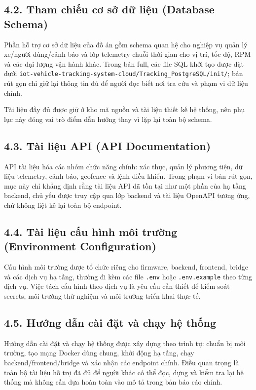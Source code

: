 \documentclass[a4paper]{extarticle}
\begin{document}
\subsection{4.2. Tham chiếu cơ sở dữ liệu (Database
Schema)}\label{42-tham-chiux1ebfu-cux1a1-sux1edf-dux1eef-liux1ec7u-database-schema}

Phần hỗ trợ cơ sở dữ liệu của đồ án gồm schema quan hệ cho nghiệp vụ quản lý xe/người dùng/cảnh báo và lớp telemetry chuỗi thời gian cho vị trí, tốc độ, RPM và các đại lượng vận hành khác. Trong bản full, các file SQL khởi tạo được đặt dưới \texttt{iot-vehicle-tracking-system-cloud/Tracking\_PostgreSQL/init/}; bản rút gọn chỉ giữ lại thông tin đủ để người đọc biết nơi tra cứu và phạm vi dữ liệu chính.

Tài liệu đầy đủ được giữ ở kho mã nguồn và tài liệu thiết kế hệ thống, nên phụ lục này đóng vai trò điểm dẫn hướng thay vì lặp lại toàn bộ schema.

\subsection{4.3. Tài liệu API (API
Documentation)}\label{43-tuxe0i-liux1ec7u-api-api-documentation}

API tài liệu hóa các nhóm chức năng chính: xác thực, quản lý phương tiện, dữ liệu telemetry, cảnh báo, geofence và lệnh điều khiển. Trong phạm vi bản rút gọn, mục này chỉ khẳng định rằng tài liệu API đã tồn tại như một phần của hạ tầng backend, chủ yếu được truy cập qua lớp backend và tài liệu OpenAPI tương ứng, chứ không liệt kê lại toàn bộ endpoint.

\subsection{4.4. Tài liệu cấu hình môi trường (Environment
Configuration)}\label{44-tuxe0i-liux1ec7u-cux1ea5u-huxecnh-muxf4i-trux1b0ux1eddng-environment-configuration}

Cấu hình môi trường được tổ chức riêng cho firmware, backend, frontend, bridge và các dịch vụ hạ tầng, thường đi kèm các file \texttt{.env} hoặc \texttt{.env.example} theo từng dịch vụ. Việc tách cấu hình theo dịch vụ là yêu cầu cần thiết để kiểm soát secrets, môi trường thử nghiệm và môi trường triển khai thực tế.

\subsection{4.5. Hướng dẫn cài đặt và chạy hệ
thống}\label{45-hux1b0ux1edbng-dux1eabn-cuxe0i-ux111ux1eb7t-vuxe0-chux1ea1y-hux1ec7-thux1ed1ng}

Hướng dẫn cài đặt và chạy hệ thống được xây dựng theo trình tự: chuẩn bị môi trường, tạo mạng Docker dùng chung, khởi động hạ tầng, chạy backend/frontend/bridge và xác nhận các endpoint chính. Điều quan trọng là toàn bộ tài liệu hỗ trợ đã đủ để người khác có thể đọc, dựng và kiểm tra lại hệ thống mà không cần dựa hoàn toàn vào mô tả trong bản báo cáo chính.
\end{document}
